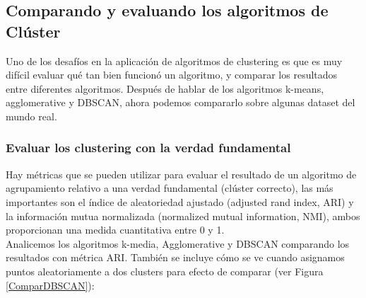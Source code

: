 \subsection{Comparando y evaluando los  algoritmos de Clúster}  

Uno de los desafíos en la aplicación de algoritmos de clustering es que es muy difícil evaluar
qué tan bien funcionó un algoritmo, y comparar los resultados entre diferentes algoritmos. Después de hablar de los algoritmos  k-means, agglomerative y DBSCAN, ahora podemos compararlo sobre algunas 
dataset  del mundo real.


\subsubsection{Evaluar los clustering con la verdad fundamental}



Hay métricas que se pueden utilizar para evaluar el resultado de un algoritmo de agrupamiento relativo a una verdad fundamental (clúster correcto), las más importantes son el índice de aleatoriedad ajustado (adjusted rand
index, ARI) y la información mutua normalizada (normalized mutual information, NMI),  ambos proporcionan una medida cuantitativa  entre 0 y 1. \\

Analicemos los algoritmos k-media, Agglomerative  y  DBSCAN  comparando los resultados con métrica ARI. También se incluye cómo se ve cuando asignamos puntos aleatoriamente a dos clusters para efecto de  comparar (ver Figura \ref{ComparDBSCAN}):\\
 
